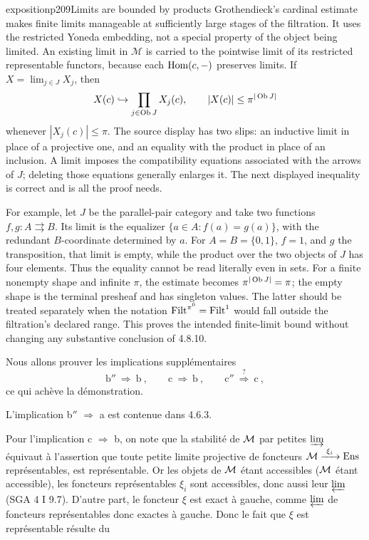 \begin{dcomment}{exposition}{p209}{Limits are bounded by products}
Grothendieck's cardinal estimate makes finite limits manageable at sufficiently large stages of the filtration. It uses the restricted Yoneda embedding, not a special property of the object being limited. An existing limit in $\mathcal M$ is carried to the pointwise limit of its restricted representable functors, because each $\operatorname{Hom}(c,-)$ preserves limits. If $X=\lim_{j\in J}X_j$, then
\[
 X(c)\hookrightarrow\prod_{j\in\operatorname{Ob} J}X_j(c),
 \qquad |X(c)|\leq\pi^{|\operatorname{Ob} J|}
\]
whenever $|X_j(c)|\leq\pi$. The source display has two slips: an inductive limit in place of a projective one, and an equality with the product in place of an inclusion. A limit imposes the compatibility equations associated with the arrows of $J$; deleting those equations generally enlarges it. The next displayed inequality is correct and is all the proof needs.

For example, let $J$ be the parallel-pair category and take two functions $f,g:A\rightrightarrows B$. Its limit is the equalizer $\{a\in A:f(a)=g(a)\}$, with the redundant $B$-coordinate determined by $a$. For $A=B=\{0,1\}$, $f=1$, and $g$ the transposition, that limit is empty, while the product over the two objects of $J$ has four elements. Thus the equality cannot be read literally even in sets. For a finite nonempty shape and infinite $\pi$, the estimate becomes $\pi^{|\operatorname{Ob} J|}=\pi$; the empty shape is the terminal presheaf and has singleton values. The latter should be treated separately when the notation $\operatorname{Filt}^{\pi^0}=\operatorname{Filt}^1$ would fall outside the filtration's declared range. This proves the intended finite-limit bound without changing any substantive conclusion of 4.8.10.
\end{dcomment}


Nous allons prouver les implications supplémentaires
\[
\text{b}'' \ \Longrightarrow\ \text{b}\ , \qquad \text{c} \ \Longrightarrow\ \text{b}\ , \qquad \text{c}'' \ \overset{?}{\Longrightarrow}\ \text{c}\ ,
\]
ce qui achève la démonstration.

L'implication b$''$ $\Longrightarrow$ a est contenue dans 4.6.3.

Pour l'implication c $\Longrightarrow$ b, on note que la stabilité de $\mathcal{M}$ par petites $\varinjlim$ équivaut à l'assertion que toute petite limite projective de foncteurs $\mathcal{M} \xrightarrow{\ \xi_i\ } \mathrm{Ens}$ représentables, est représentable. Or les objets de $\mathcal{M}$ étant accessibles ($\mathcal{M}$ étant accessible), les foncteurs représentables $\xi_i$ sont accessibles, donc aussi leur $\varprojlim$ (SGA 4 I 9.7). D'autre part, le foncteur $\xi$ est exact à gauche, comme $\varprojlim$ de foncteurs représentables donc exactes à gauche. Donc le fait que $\xi$ est représentable résulte du %

